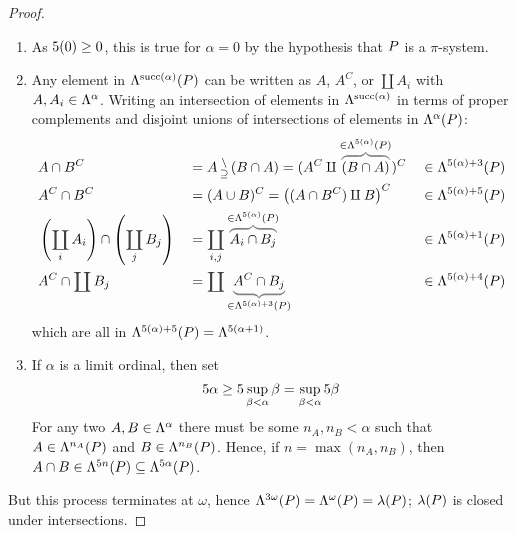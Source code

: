 \documentclass{scrartcl}
\newcommand{\propersetminus}{\begin{smallmatrix} \setminus\\\supseteq \end{smallmatrix}}%
\DeclareMathOperator*{\bigdisjunion}{\coprod}
\newcommand{\disjunion}{\mathbin{\amalg}}
\DeclareMathOperator{\successor}{succ}
\begin{document}
\begin{proof}
  \begin{enumerate}
  \item As $5(0)\geq 0$, this is true for \(\alpha=0\) by the hypothesis that \(P\) is a \(\pi\)-system.
  \item Any element in \(\lambdify^{\successor(\alpha)}(\pisystem)\) can be written as
    \(A\), \(A^C\), or \(\bigdisjunion A_i\) with \(A,A_i\in\Lambda^{\alpha}\).
    Writing an intersection of elements in
    \(\lambdify^{\successor(\alpha)}\) in terms of proper complements and disjoint
    unions of intersections of elements in \(\Lambda^\alpha(P)\):
      \begin{align*}
        &A\cap B^C &&= A\propersetminus (B\cap A) = (A^{C} \disjunion \grayoverbrace{(B \cap A)}{\in\lambdify^{\nextord(\alpha)}(\pisystem)})^{C}
        &&\in \lambdify^{\nextord(\alpha)+3}(\pisystem) \\
        &A^C\cap B^C &&= (A\cup B)^C = \left((A\cap B^C)\disjunion B  \right)^C
        &&\in \lambdify^{\nextord(\alpha)+5}(\pisystem) \\
        & \left(\bigdisjunion_{i} A_i\right) \cap
        \left(\bigdisjunion_j B_j\right) &&= \bigdisjunion_{i,j}
                                            \grayoverbrace{A_i\cap B_j}{\in\lambdify^{\nextord(\alpha)}(\pisystem)}
        &&\in
        \lambdify^{\nextord(\alpha)+1}(\pisystem) \\
       & A^C \cap \bigdisjunion B_j &&= \bigdisjunion \grayunderbrace{A^C\cap
           B_j}{\in\lambdify^{\nextord(\alpha)+3}(\pisystem)} &&\in\lambdify^{\nextord(\alpha)+4}(\pisystem)
      \end{align*}
          which are all in \(\Lambda^{5(\alpha)+5}(P)= \Lambda^{5(\alpha+1)}\).
  \item
    If \(\alpha\) is a limit ordinal, then set
    \[
      5\alpha \geq 5\sup_{\beta <\alpha}\beta = \sup_{\beta <
        \alpha}5\beta
    \]
    For any two \(A,B\in\Lambda^\alpha\) there must be some \(n_A,n_B<\alpha\)
    such that \(A\in \Lambda^{n_A}(P)\) and
    \(B\in\Lambda^{n_B}(P)\). Hence, if \(n=\max(n_A,n_B)\), then
    \(A\cap B\in \Lambda^{5 n}(P)\subseteq
    \Lambda^{5\alpha}(P)\).
  \end{enumerate}
  But this process terminates at \(\omega\), hence
  \(\Lambda^{3\omega}(P)=\Lambda^\omega(P)=\lambda(P)\);
  \(\lambda(P)\) is closed under intersections.
\end{proof}
\end{document}
